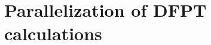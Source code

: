 \documentclass[main.tex]{subfiles}
\begin{document}
\chapter{Parallelization of DFPT calculations}
\end{document}
